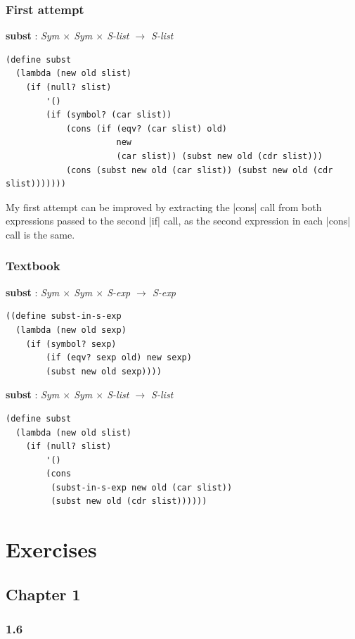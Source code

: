\documentclass[a4paper]{article}
\begin{document}
\subsubsection*{First attempt}

\textbf{subst} : \textit{Sym $\times$ Sym $\times$ S-list $\rightarrow$ S-list}
\begin{lstlisting}[aboveskip=0pt]
(define subst
  (lambda (new old slist)
    (if (null? slist)
        '()
        (if (symbol? (car slist))
            (cons (if (eqv? (car slist) old)
                      new
                      (car slist)) (subst new old (cdr slist)))
            (cons (subst new old (car slist)) (subst new old (cdr slist)))))))
\end{lstlisting}

My first attempt can be improved by extracting the |cons| call from both expressions passed to the second |if| call, as the second expression in each |cons| call is the same.

\subsubsection*{Textbook}

\textbf{subst} : \textit{Sym $\times$ Sym $\times$ S-exp $\rightarrow$ S-exp}
\begin{lstlisting}[aboveskip=0pt]
((define subst-in-s-exp
  (lambda (new old sexp)
    (if (symbol? sexp)
        (if (eqv? sexp old) new sexp)
        (subst new old sexp))))
\end{lstlisting}

\textbf{subst} : \textit{Sym $\times$ Sym $\times$ S-list $\rightarrow$ S-list}
\begin{lstlisting}[aboveskip=0pt]
(define subst
  (lambda (new old slist)
    (if (null? slist)
        '()
        (cons
         (subst-in-s-exp new old (car slist))
         (subst new old (cdr slist))))))
\end{lstlisting}

\newpage

\section{Exercises}

\subsection{Chapter 1}

\subsubsection*{1.6}
\end{document}
